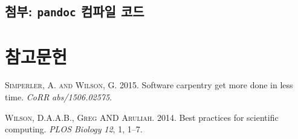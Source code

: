 \documentclass[12pt,]{article}
\begin{document}
\subsection{\texorpdfstring{첨부: \texttt{pandoc} 컴파일
코드}{첨부: pandoc 컴파일 코드}}\label{-pandoc--}

\section*{참고문헌}

\hypertarget{refs}{}
\hypertarget{ref-DBLP:journalsux2fcorrux2fSimperlerW15}{}
\textsc{Simperler, A. and Wilson, G.} 2015. Software carpentry get more
done in less time. \emph{CoRR} \emph{abs/1506.02575}.

\hypertarget{ref-10.1371ux2fjournal.pbio.1001745}{}
\textsc{Wilson, D.A.A.B., Greg AND Aruliah}. 2014. Best practices for
scientific computing. \emph{PLOS Biology} \emph{12}, 1, 1--7.
\end{document}
